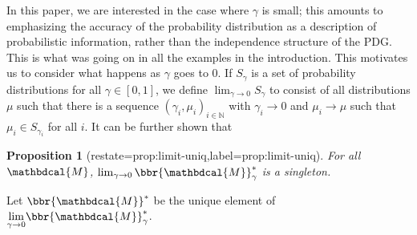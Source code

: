 \documentclass{article}
\theoremstyle{plain}
\newtheorem{prop}[theorem]{Proposition}
\theoremstyle{definition}
\theoremstyle{remark}
\let\H\relax
\DeclareMathOperator{\H}{\mathrm{H}} %
\DeclareMathOperator*{\E}{\mathbb{E}} %
\newcommand\mat[1]{\mathbf{#1}}
\newcommand{\commentout}[1]{\ignorespaces}
\newcommand{\bp}[1][L]{\mat{p}_{\!_{#1}\!}}
\newcommand{\dg}[1]{\mathbdcal{#1}}
\newcommand\Inc{\mathit{Inc}}
\newcommand{\ed}[3]{#2
  \overset{\smash{\mskip-5mu\raisebox{-1pt}{$\scriptscriptstyle
        #1$}}}{\rightarrow} #3}
\newcommand{\alle}[1][L]{_{ \ed {#1}XY}}
\newcommand{\begthm}[2]{\begin{#1}[restate=#2,label=#2]}
\numberwithin{equation}{section}
\begin{document}
In this paper, we are interested in the case where $\gamma$ is small;
this amounts to emphasizing the accuracy of the probability
distribution as a description of probabilistic information, rather than
the independence structure of the PDG.  This is what was going on in
all the examples in the introduction.  This motivates us to consider
what happens as $\gamma$ goes to 0.  If $S_\gamma$ is a set of
probability distributions for all $\gamma \in [0,1]$, we define
$\lim_{\gamma \rightarrow 0} 
S_\gamma$ to consist of all distributions $\mu$ such that 
there is a sequence $(\gamma_i, \mu_i)_{i \in \mathbb N}$ with
$\gamma_i \to 0$ and $\mu_i \to \mu$ such that $\mu_i \in
S_{\gamma_i}$ for all $i$. 
It can be further shown that 
\begthm{prop}{prop:limit-uniq}
    For all $\dg M$,
	$\lim_{\gamma\to0}\bbr{\dg M}_\gamma^*$ is a singleton.
\end{prop}
Let
$\bbr{{\dg M}}^*$ be the unique element of $\smash{\lim\limits_{\gamma
    \rightarrow 0}} \bbr{{\dg M}}_\gamma^*$. 
\commentout{
There is a unique such distribution because, as we now
show, the score is strongly convex
which can be found efficiently \cite{strongconvexopt}.
}
\commentout{
    \begin{prop}\label{prop:u-convex}
      $\bbr{\dg M}_\gamma(\mu)$ is $\gamma$-strongly convex.%
    \end{prop}
    \commentout{
    \begin{proof}
      $\Inc_{\dg M}( \mu)$ is convex in $\mu$
      (\Cref{thm:inc-convex}), and $\gamma\sum\alle \E_{x\sim \mu_X}
      \H(\bp(x))$ is linear in $\mu$.  
		Negative entropy is $1$-strongly convex
		(\Cref{prop:neg-ent-convex}), so $- \gamma \H(\mu)$ is $\gamma$-strongly convex.
		The sum of a $\gamma$-strongly convex, linear, and
        convex functions must be $\gamma$-strongly convex. 
	\end{proof}
    }
}%
\end{document}
